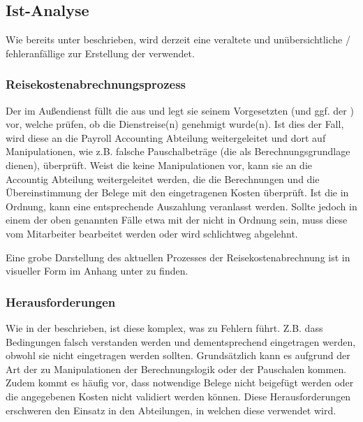 \subsection{Ist-Analyse}

Wie bereits unter  beschrieben, wird derzeit eine veraltete und unübersichtliche / fehleranfällige  zur Erstellung der  verwendet. 

\subsubsection{Reisekostenabrechnungsprozess}
\label{sec:Analysephase:Reisekostenabrechnungsprozess}

Der  im Außendienst füllt die  aus und legt sie seinem Vorgesetzten (und ggf. der ) vor, welche prüfen, ob die Dienstreise(n) genehmigt wurde(n). Ist dies der Fall, wird diese an die Payroll Accounting Abteilung weitergeleitet und dort auf Manipulationen, wie z.B. falsche Pauschalbeträge (die als Berechnungsgrundlage dienen), überprüft. Weist die  keine Manipulationen vor, kann sie an die Accountig Abteilung weitergeleitet werden, die die Berechnungen und die Übereinstimmung der Belege mit den eingetragenen Kosten überprüft. Ist die  in Ordnung, kann eine entsprechende Auszahlung veranlasst werden. Sollte jedoch in einem der oben genannten Fälle etwa mit der  nicht in Ordnung sein, muss diese vom Mitarbeiter bearbeitet werden oder wird schlichtweg abgelehnt.

Eine grobe Darstellung des aktuellen Prozesses der Reisekostenabrechnung ist in visueller Form im Anhang unter  zu finden.

\subsubsection{Herausforderungen}

Wie in der  beschrieben, ist diese  komplex, was zu Fehlern führt. Z.B. dass Bedingungen falsch verstanden werden und dementsprechend eingetragen werden, obwohl sie nicht eingetragen werden sollten. Grundsätzlich kann es aufgrund der Art der  zu Manipulationen der Berechnungslogik oder der Pauschalen kommen. Zudem kommt es häufig vor, dass notwendige Belege nicht beigefügt werden oder die angegebenen Kosten nicht validiert werden können. Diese Herausforderungen erschweren den Einsatz in den Abteilungen, in welchen diese verwendet wird.

